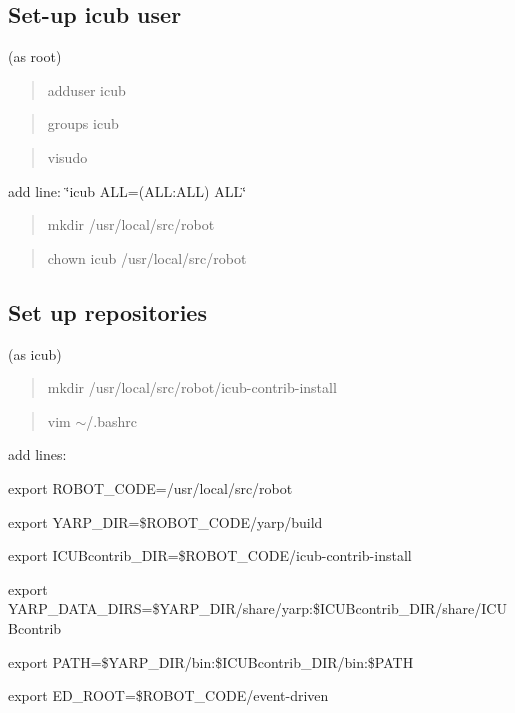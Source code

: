 \subsection*{Set-\/up icub user}

(as root)

\begin{quote}
adduser icub \end{quote}


\begin{quote}
groups icub \end{quote}


\begin{quote}
visudo \end{quote}



\begin{DoxyItemize}
\item add line\+: \char`\"{}icub A\+L\+L=(\+A\+L\+L\+:\+A\+L\+L) A\+L\+L\char`\"{}
\end{DoxyItemize}

\begin{quote}
mkdir /usr/local/src/robot \end{quote}


\begin{quote}
chown icub /usr/local/src/robot \end{quote}


\subsection*{Set up repositories}

(as icub)

\begin{quote}
mkdir /usr/local/src/robot/icub-\/contrib-\/install \end{quote}


\begin{quote}
vim $\sim$/.bashrc \end{quote}


add lines\+:


\begin{DoxyItemize}
\item export R\+O\+B\+O\+T\+\_\+\+C\+O\+DE=/usr/local/src/robot
\item export Y\+A\+R\+P\+\_\+\+D\+IR=\$\+R\+O\+B\+O\+T\+\_\+\+C\+O\+DE/yarp/build
\item export I\+C\+U\+Bcontrib\+\_\+\+D\+IR=\$\+R\+O\+B\+O\+T\+\_\+\+C\+O\+DE/icub-\/contrib-\/install
\item export Y\+A\+R\+P\+\_\+\+D\+A\+T\+A\+\_\+\+D\+I\+RS=\$\+Y\+A\+R\+P\+\_\+\+D\+IR/share/yarp\+:\$\+I\+C\+U\+Bcontrib\+\_\+\+D\+IR/share/\+I\+C\+U\+Bcontrib
\item export P\+A\+TH=\$\+Y\+A\+R\+P\+\_\+\+D\+IR/bin\+:\$\+I\+C\+U\+Bcontrib\+\_\+\+D\+IR/bin\+:\$\+P\+A\+TH
\item export E\+D\+\_\+\+R\+O\+OT=\$\+R\+O\+B\+O\+T\+\_\+\+C\+O\+DE/event-\/driven
\end{DoxyItemize}

